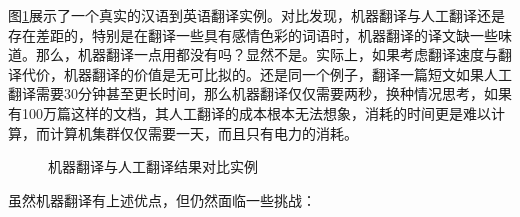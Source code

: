 \parinterval 图\ref{fig:1-8}展示了一个真实的汉语到英语翻译实例。对比发现，机器翻译与人工翻译还是存在差距的，特别是在翻译一些具有感情色彩的词语时，机器翻译的译文缺一些味道。那么，机器翻译一点用都没有吗？显然不是。实际上，如果考虑翻译速度与翻译代价，机器翻译的价值是无可比拟的。还是同一个例子，翻译一篇短文如果人工翻译需要30分钟甚至更长时间，那么机器翻译仅仅需要两秒，换种情况思考，如果有100万篇这样的文档，其人工翻译的成本根本无法想象，消耗的时间更是难以计算，而计算机集群仅仅需要一天，而且只有电力的消耗。

\begin{figure}[htp]
    \centering

    \caption{机器翻译与人工翻译结果对比实例}
    \label{fig:1-8}
\end{figure}

\parinterval 虽然机器翻译有上述优点，但仍然面临一些挑战：

